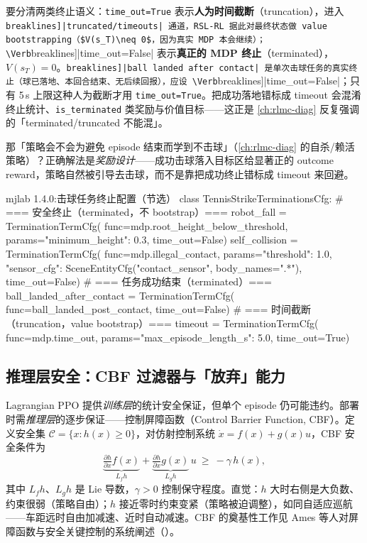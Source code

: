 \begin{insight}\label{ins:rlmc-strike-termination}
要分清两类终止语义：\verb|time_out=True| 表示\textbf{人为时间截断}（truncation），进入 \Verb[breaklines]|truncated/timeouts| 通道，RSL-RL 据此对最终状态做 value bootstrapping（$V(s_T)\neq 0$，因为真实 MDP 本会继续）；\Verb[breaklines]|time_out=False| 表示\textbf{真正的 MDP 终止}（terminated），$V(s_T)=0$。\Verb[breaklines]|ball landed after contact| 是单次击球任务的真实终止（球已落地、本回合结束、无后续回报），应设 \Verb[breaklines]|time_out=False|；只有 5\,s 上限这种人为截断才用 \verb|time_out=True|。把成功落地错标成 timeout 会混淆终止统计、\verb|is_terminated| 类奖励与价值目标——这正是 \cref{ch:rlmc-diag} 反复强调的「terminated/truncated 不能混」。
\end{insight}

那「策略会不会为避免 episode 结束而学到不击球」（\cref{ch:rlmc-diag} 的自杀/赖活策略）？正确解法是\emph{奖励设计}——成功击球落入目标区给显著正的 outcome reward，策略自然被引导去击球，而不是靠把成功终止错标成 timeout 来回避。

\begin{codebox}[Python]{mjlab 1.4.0:击球任务终止配置（节选）}
class TennisStrikeTerminationsCfg:
    # === 安全终止（terminated，不 bootstrap）===
    robot_fall = TerminationTermCfg(
        func=mdp.root_height_below_threshold,
        params={"minimum_height": 0.3}, time_out=False)
    self_collision = TerminationTermCfg(
        func=mdp.illegal_contact,
        params={"threshold": 1.0,
                "sensor_cfg": SceneEntityCfg("contact_sensor", body_names=".*")},
        time_out=False)
    # === 任务成功结束（terminated）===
    ball_landed_after_contact = TerminationTermCfg(
        func=ball_landed_post_contact, time_out=False)
    # === 时间截断（truncation，value bootstrap）===
    timeout = TerminationTermCfg(
        func=mdp.time_out,
        params={"max_episode_length_s": 5.0}, time_out=True)
\end{codebox}

\subsection{推理层安全：CBF 过滤器与「放弃」能力}

Lagrangian PPO 提供\emph{训练层}的统计安全保证，但单个 episode 仍可能违约。部署时需\emph{推理层}的逐步保证——控制屏障函数（Control Barrier Function, CBF）。定义安全集 $\mathcal{C}=\{x:h(x)\ge 0\}$，对仿射控制系统 $\dot{x}=f(x)+g(x)u$，CBF 安全条件为
\begin{equation}
\underbrace{\tfrac{\partial h}{\partial x}f(x)}_{L_f h} + \underbrace{\tfrac{\partial h}{\partial x}g(x)}_{L_g h}\,u \ \ge\ -\gamma\, h(x),
\label{eq:rlmc-strike-cbf}
\end{equation}
其中 $L_f h$、$L_g h$ 是 Lie 导数，$\gamma>0$ 控制保守程度。直觉：$h$ 大时右侧是大负数、约束很弱（策略自由）；$h$ 接近零时约束变紧（策略被迫调整），如同自适应巡航——车距远时自由加减速、近时自动减速。CBF 的奠基性工作见 Ames 等人对屏障函数与安全关键控制的系统阐述（\cite{ames2017cbf}）。

